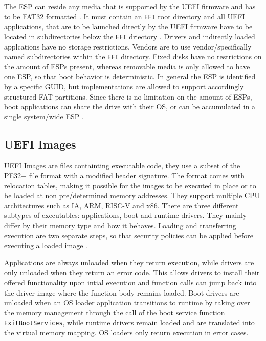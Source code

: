 The \ac{ESP} can reside any media that is supported by the \ac{UEFI} firmware and has to be \ac{FAT}32 formatted \cite[Section 13.3]{uefi-spec}.
It must contain an \lstinline{EFI} root directory \cite[Section 13.3.1.3]{uefi-spec} and all \ac{UEFI} applications, that are to be launched directly by the \ac{UEFI} firmware have to be located in subdirectories below the \lstinline{EFI} driectory \cite[Section 13.3.1.3]{uefi-spec}. Drivers and indirectly loaded applcations have no storage restrictions. Vendors are to use vendor\-/specifically named subdirectories within the \lstinline{EFI} directory. Fixed disks have no restrictions on the amount of \acp{ESP} present, whereas removable media is only allowed to have one \ac{ESP}, so that boot behavior is deterministic. In general the \ac{ESP} is identified by a specific \ac{GUID}, but implementations are allowed to support accordingly structured \ac{FAT} partitions. Since there is no limitation on the amount of \acp{ESP}, boot applications can share the drive with their \ac{OS}, or can be accumulated in a single system\-/wide \ac{ESP} \cite[Section 13.3.3]{uefi-spec}.


\subsection{\acs{UEFI} Images}

\ac{UEFI} Images are files containting executable code, they use a subset of the \ac{PE32}+ file format with a modified header signature.
The format comes with relocation tables, making it possible for the images to be executed in place or to be loaded at non pre\-/determined memory addresses.
They support multiple CPU architectures such as IA, ARM, RISC-V and x86.
There are three different subtypes of executables: applications, boot and runtime drivers. They mainly differ by their memory type and how it behaves.
Loading and transferring execution are two separate steps, so that security policies can be applied before executing a loaded image \cite[Section 2.1.1]{uefi-spec}.

Applications are always unloaded when they return execution, while drivers are only unloaded when they return an error code. This allows drivers to install their offered functionality upon intial execution and function calls can jump back into the driver image where the function body remains loaded.
Boot drivers are unloaded when an \ac{OS} loader application transitions to runtime by taking over the memory management through the call of the boot service function \lstinline{ExitBootServices}, while runtime drivers remain loaded and are translated into the virtual memory mapping. \ac{OS} loaders only return execution in error cases.

